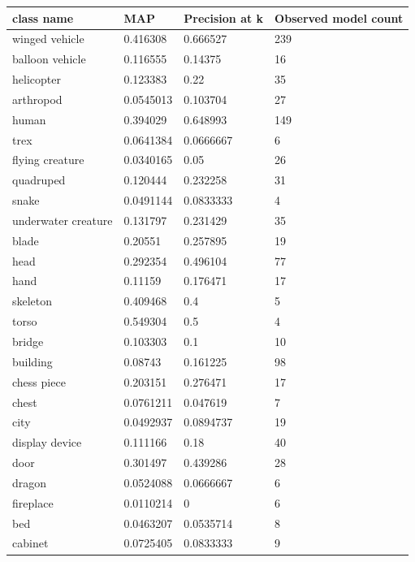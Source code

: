 \documentclass{bigdata}
\begin{document}
\begin{minipage}{\linewidth}
	\begin{center}
		\begin{tabular}
			{ l | l | l | l}
			\textbf{class name} & \textbf{MAP} & \textbf{Precision at k} & \textbf{Observed model count} \\ \hline
			winged vehicle & 0.416308 & 0.666527 & 239 \\ \hline
			balloon vehicle & 0.116555 & 0.14375 & 16 \\ \hline
			helicopter & 0.123383 & 0.22 & 35 \\ \hline
			arthropod & 0.0545013 & 0.103704 & 27 \\ \hline
			human & 0.394029 & 0.648993 & 149 \\ \hline
			trex & 0.0641384 & 0.0666667 & 6 \\ \hline
			flying creature & 0.0340165 & 0.05 & 26 \\ \hline
			quadruped & 0.120444 & 0.232258 & 31 \\ \hline
			snake & 0.0491144 & 0.0833333 & 4 \\ \hline
			underwater creature & 0.131797 & 0.231429 & 35 \\ \hline
			blade & 0.20551 & 0.257895 & 19 \\ \hline
			head & 0.292354 & 0.496104 & 77 \\ \hline
			hand & 0.11159 & 0.176471 & 17 \\ \hline
			skeleton & 0.409468 & 0.4 & 5 \\ \hline
			torso & 0.549304 & 0.5 & 4 \\ \hline
			bridge & 0.103303 & 0.1 & 10 \\ \hline
			building & 0.08743 & 0.161225 & 98 \\ \hline
			chess piece & 0.203151 & 0.276471 & 17 \\ \hline
			chest & 0.0761211 & 0.047619 & 7 \\ \hline
			city & 0.0492937 & 0.0894737 & 19 \\ \hline
			display device & 0.111166 & 0.18 & 40 \\ \hline
			door & 0.301497 & 0.439286 & 28 \\ \hline
			dragon & 0.0524088 & 0.0666667 & 6 \\ \hline
			fireplace & 0.0110214 & 0 & 6 \\ \hline
			bed & 0.0463207 & 0.0535714 & 8 \\ \hline
			cabinet & 0.0725405 & 0.0833333 & 9 \\ \hline

\end{tabular}
\end{center}
\end{minipage}
\end{document}
